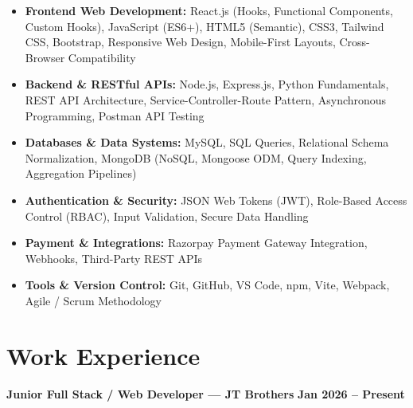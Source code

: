 \documentclass[a4paper,10pt]{article}
\begin{document}
\begin{itemize}

    \item \textbf{Frontend Web Development:}
    React.js (Hooks, Functional Components, Custom Hooks), JavaScript (ES6+),
    HTML5 (Semantic), CSS3, Tailwind CSS, Bootstrap, Responsive Web Design,
    Mobile-First Layouts, Cross-Browser Compatibility

    \item \textbf{Backend \& RESTful APIs:}
    Node.js, Express.js, Python Fundamentals, REST API Architecture,
    Service-Controller-Route Pattern, Asynchronous Programming, Postman API Testing

    \item \textbf{Databases \& Data Systems:}
    MySQL, SQL Queries, Relational Schema Normalization,
    MongoDB (NoSQL, Mongoose ODM, Query Indexing, Aggregation Pipelines)

    \item \textbf{Authentication \& Security:}
    JSON Web Tokens (JWT), Role-Based Access Control (RBAC),
    Input Validation, Secure Data Handling

    \item \textbf{Payment \& Integrations:}
    Razorpay Payment Gateway Integration, Webhooks, Third-Party REST APIs

    \item \textbf{Tools \& Version Control:}
    Git, GitHub, VS Code, npm, Vite, Webpack, Agile / Scrum Methodology

\end{itemize}

\section*{Work Experience}

\textbf{Junior Full Stack / Web Developer --- JT Brothers}
\hfill
\textbf{Jan 2026 -- Present}
\end{document}
